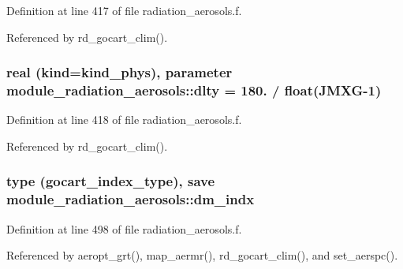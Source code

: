 Definition at line 417 of file radiation\+\_\+aerosols.\+f.



Referenced by rd\+\_\+gocart\+\_\+clim().

\subsubsection[{\texorpdfstring{dlty}{dlty}}]{\setlength{\rightskip}{0pt plus 5cm}real (kind=kind\+\_\+phys), parameter module\+\_\+radiation\+\_\+aerosols\+::dlty = 180. / float(J\+M\+XG-\/1)\hspace{0.3cm}{\ttfamily [private]}}\hypertarget{group__module__radiation__aerosols_ga499bb3c75e9802c5ee7fd6cdb6660f7e}{}\label{group__module__radiation__aerosols_ga499bb3c75e9802c5ee7fd6cdb6660f7e}


Definition at line 418 of file radiation\+\_\+aerosols.\+f.



Referenced by rd\+\_\+gocart\+\_\+clim().

\subsubsection[{\texorpdfstring{dm\+\_\+indx}{dm_indx}}]{\setlength{\rightskip}{0pt plus 5cm}type (gocart\+\_\+index\+\_\+type), save module\+\_\+radiation\+\_\+aerosols\+::dm\+\_\+indx\hspace{0.3cm}{\ttfamily [private]}}\hypertarget{group__module__radiation__aerosols_ga70c58693c0aac6e4dbb6cf425fb0ce6a}{}\label{group__module__radiation__aerosols_ga70c58693c0aac6e4dbb6cf425fb0ce6a}


Definition at line 498 of file radiation\+\_\+aerosols.\+f.



Referenced by aeropt\+\_\+grt(), map\+\_\+aermr(), rd\+\_\+gocart\+\_\+clim(), and set\+\_\+aerspc().


